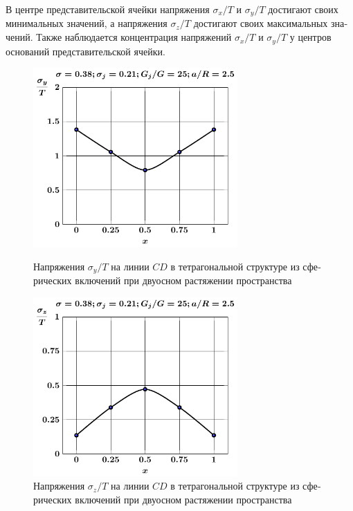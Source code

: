 \begin{russian}
В центре представительской ячейки напряжения $\sigma_x/T$ и $\sigma_y/T$ достигают своих минимальных значений, а напряжения $\sigma_z/T$ достигают своих максимальных значений. Также наблюдается концентрация напряжений $\sigma_x/T$ и $\sigma_y/T$ у центров оснований представительской ячейки.

%

\begin{figure}[h!]
\centering\footnotesize
\parbox[b]{7.5cm}{\centering\includegraphics[width=7.8cm]{inc8-a25-d95-g25-c-c-sig_y-spheres-tension2.pdf}
\caption{Напряжения $\sigma_y/T$ на линии $CD$ в тетрагональной структуре из сферических включений при двуосном растяжении пространства
\label{f:8:28}}}\hfil\hfil
\parbox[b]{7.5cm}{\centering\includegraphics[width=7.8cm]{inc8-a25-d95-g25-c-c-sig_z-spheres-tension2.pdf}
\caption{Напряжения $\sigma_z/T$ на линии $CD$ в тетрагональной структуре из сферических включений при двуосном растяжении пространства
\label{f:8:29}}}
\end{figure}


\end{russian}
